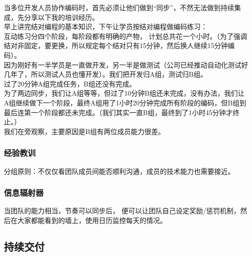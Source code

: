 当多位开发人员协作编码时，首先必须让他们做到``同步''，不然无法做到持续集成，先分享以下我的培训经历。\\
早上讲完结对编程的基本知识，下午让学员按结对编程做编码练习：\\
互动练习分四个阶段，每阶段都有明确的产物，
计划总共花一个小时。（为了强调结对非固定，要更换，所以规定每个结对只有15分钟，然后换人继续15分钟编码）。\\
因为刚好有一半学员是一直做开发，另一半是做测试（公司已经推动自动化测试好几年了，所以测试人员也懂开发）。我们把开发归A组，测试归B组。\\
过了20分钟A组完成任务，B组还没有完成。\\
为了两边同步，我们让A组等等，但过了10分钟B组还未完成，没有办法，我们让A组继续做下一个阶段，最终A组用了1小时20分钟完成所有阶段的编码，但B组到最后连第一个阶段都还未完成。（我们其实一直B组，最终到了1小时45分钟才终止。）\\
我们在旁观察，主要原因是B组有两位成员能力很差。

\hypertarget{ux7ecfux9a8cux6559ux8bad}{%
\subsubsection{经验教训}\label{ux7ecfux9a8cux6559ux8bad}}

分组原则：不仅仅看团队成员间能否顺利沟通，成员的技术能力也需要接近。

\hypertarget{ux4fe1ux606fux8f90ux5c04ux5668}{%
\subsubsection{信息辐射器}\label{ux4fe1ux606fux8f90ux5c04ux5668}}

当团队的能力相当，节奏可以同步后，
便可以让团队自己设定奖励/惩罚机制，然后在大家都能看到的墙上，使用日历监控每天的情况。


\hypertarget{ux6301ux7eedux4ea4ux4ed8}{%
\subsection{持续交付}\label{ux6301ux7eedux4ea4ux4ed8}}

